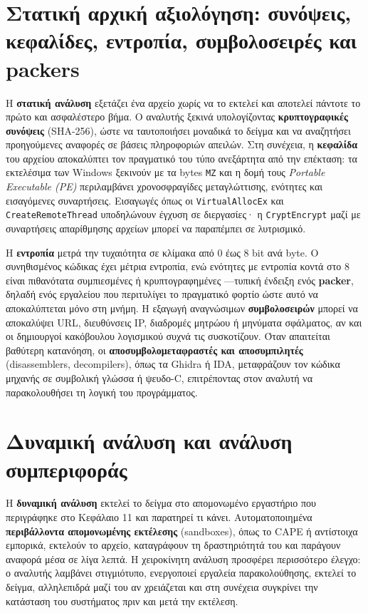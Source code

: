 \section{Στατική αρχική αξιολόγηση: συνόψεις, κεφαλίδες, εντροπία, συμβολοσειρές και packers}\label{sec:12.1}
Η \textbf{στατική ανάλυση} εξετάζει ένα αρχείο χωρίς να το εκτελεί και αποτελεί πάντοτε το πρώτο και ασφαλέστερο βήμα. Ο αναλυτής ξεκινά υπολογίζοντας \textbf{κρυπτογραφικές συνόψεις} (SHA-256), ώστε να ταυτοποιήσει μοναδικά το δείγμα και να αναζητήσει προηγούμενες αναφορές σε βάσεις πληροφοριών απειλών. Στη συνέχεια, η \textbf{κεφαλίδα} του αρχείου αποκαλύπτει τον πραγματικό του τύπο ανεξάρτητα από την επέκταση: τα εκτελέσιμα των Windows ξεκινούν με τα bytes \texttt{MZ} και η δομή τους \emph{Portable Executable (PE)} περιλαμβάνει χρονοσφραγίδες μεταγλώττισης, ενότητες και εισαγόμενες συναρτήσεις. Εισαγωγές όπως οι \texttt{VirtualAllocEx} και \texttt{CreateRemoteThread} υποδηλώνουν έγχυση σε διεργασίες· η \texttt{CryptEncrypt} μαζί με συναρτήσεις απαρίθμησης αρχείων μπορεί να παραπέμπει σε λυτρισμικό.

Η \textbf{εντροπία} μετρά την τυχαιότητα σε κλίμακα από 0 έως 8 bit ανά byte. Ο συνηθισμένος κώδικας έχει μέτρια εντροπία, ενώ ενότητες με εντροπία κοντά στο 8 είναι πιθανότατα συμπιεσμένες ή κρυπτογραφημένες —τυπική ένδειξη ενός \textbf{packer}, δηλαδή ενός εργαλείου που περιτυλίγει το πραγματικό φορτίο ώστε αυτό να αποκαλύπτεται μόνο στη μνήμη. Η εξαγωγή αναγνώσιμων \textbf{συμβολοσειρών} μπορεί να αποκαλύψει URL, διευθύνσεις IP, διαδρομές μητρώου ή μηνύματα σφάλματος, αν και οι δημιουργοί κακόβουλου λογισμικού συχνά τις συσκοτίζουν. Όταν απαιτείται βαθύτερη κατανόηση, οι \textbf{αποσυμβολομεταφραστές και αποσυμπιλητές} (disassemblers, decompilers), όπως τα Ghidra ή IDA, μεταφράζουν τον κώδικα μηχανής σε συμβολική γλώσσα ή ψευδο-C, επιτρέποντας στον αναλυτή να παρακολουθήσει τη λογική του προγράμματος.

\section{Δυναμική ανάλυση και ανάλυση συμπεριφοράς}\label{sec:12.2}
Η \textbf{δυναμική ανάλυση} εκτελεί το δείγμα στο απομονωμένο εργαστήριο που περιγράφηκε στο Κεφάλαιο 11 και παρατηρεί τι κάνει. Αυτοματοποιημένα \textbf{περιβάλλοντα απομονωμένης εκτέλεσης} (sandboxes), όπως το CAPE ή αντίστοιχα εμπορικά, εκτελούν το αρχείο, καταγράφουν τη δραστηριότητά του και παράγουν αναφορά μέσα σε λίγα λεπτά. Η χειροκίνητη ανάλυση προσφέρει περισσότερο έλεγχο: ο αναλυτής λαμβάνει στιγμιότυπο, ενεργοποιεί εργαλεία παρακολούθησης, εκτελεί το δείγμα, αλληλεπιδρά μαζί του αν χρειάζεται και στη συνέχεια συγκρίνει την κατάσταση του συστήματος πριν και μετά την εκτέλεση.

